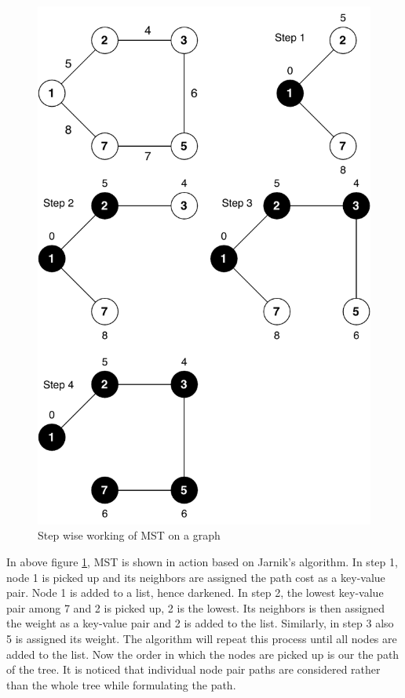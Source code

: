 \documentclass[journal,twoside,web]{ieeecolor}
\begin{document}
\begin{figure}[!h]
    \centerline{\includegraphics[scale=0.55]{figures/mst.pdf}}
    \caption{Step wise working of MST on a graph}
    \label{fig3}
\end{figure}

In above figure \ref{fig3}, MST is shown in action based on Jarnik's algorithm. In step 1, node 1 is picked up and its neighbors are assigned the path cost as a key-value pair. Node 1 is added to a list, hence darkened. In step 2, the lowest key-value pair among 7 and 2 is picked up, 2 is the lowest. Its neighbors is then assigned the weight as a key-value pair and 2 is added to the list. Similarly, in step 3 also 5 is assigned its weight. The algorithm will repeat this process until all nodes are added to the list. Now the order in which the nodes are picked up is our the path of the tree. It is noticed that individual node pair paths are considered rather than the whole tree while formulating the path.
\end{document}
